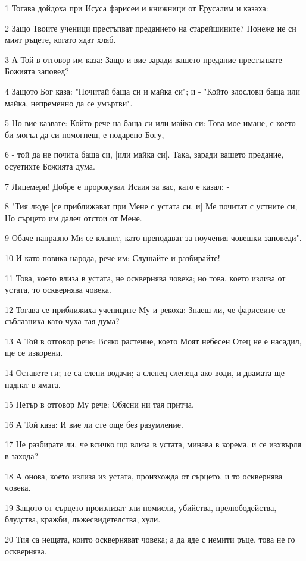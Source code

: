 \par 1 Тогава дойдоха при Исуса фарисеи и книжници от Ерусалим и казаха:
\par 2 Защо Твоите ученици престъпват преданието на старейшините? Понеже не си мият ръцете, когато ядат хляб.
\par 3 А Той в отговор им каза: Защо и вие заради вашето предание престъпвате Божията заповед?
\par 4 Защото Бог каза: "Почитай баща си и майка си"; и - "Който злослови баща или майка, непременно да се умъртви".
\par 5 Но вие казвате: Който рече на баща си или майка си: Това мое имане, с което би могъл да си помогнеш, е подарено Богу,
\par 6 - той да не почита баща си, [или майка си]. Така, заради вашето предание, осуетихте Божията дума.
\par 7 Лицемери! Добре е пророкувал Исаия за вас, като е казал: -
\par 8 "Тия люде [се приближават при Мене с устата си, и] Ме почитат с устните си; Но сърцето им далеч отстои от Мене.
\par 9 Обаче напразно Ми се кланят, като преподават за поучения човешки заповеди".
\par 10 И като повика народа, рече им: Слушайте и разбирайте!
\par 11 Това, което влиза в устата, не осквернява човека; но това, което излиза от устата, то осквернява човека.
\par 12 Тогава се приближиха учениците Му и рекоха: Знаеш ли, че фарисеите се съблазниха като чуха тая дума?
\par 13 А Той в отговор рече: Всяко растение, което Моят небесен Отец не е насадил, ще се изкорени.
\par 14 Оставете ги; те са слепи водачи; а слепец слепеца ако води, и двамата ще паднат в ямата.
\par 15 Петър в отговор Му рече: Обясни ни тая притча.
\par 16 А Той каза: И вие ли сте още без разумление.
\par 17 Не разбирате ли, че всичко що влиза в устата, минава в корема, и се изхвърля в захода?
\par 18 А онова, което излиза из устата, произхожда от сърцето, и то осквернява човека.
\par 19 Защото от сърцето произлизат зли помисли, убийства, прелюбодейства, блудства, кражби, лъжесвидетелства, хули.
\par 20 Тия са нещата, които оскверняват човека; а да яде с немити ръце, това не го осквернява.
